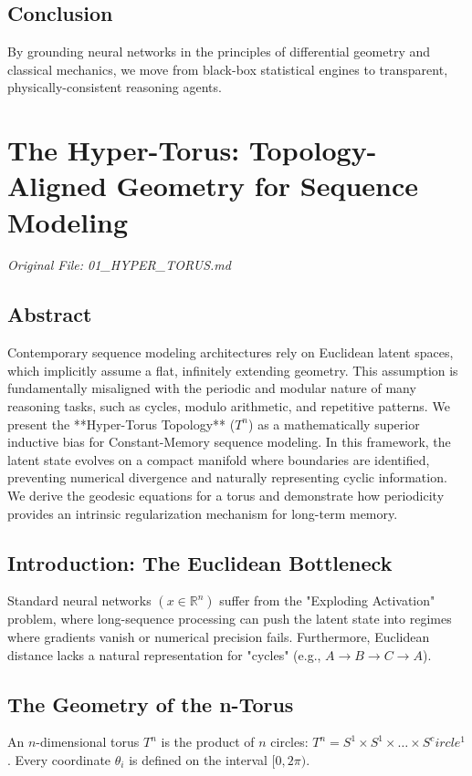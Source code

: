 \documentclass[11pt,a4paper]{report}
\begin{document}
\section{Conclusion}
By grounding neural networks in the principles of differential geometry and classical mechanics, we move from black-box statistical engines to transparent, physically-consistent reasoning agents.

\chapter{The Hyper-Torus: Topology-Aligned Geometry for Sequence Modeling}
\textit{Original File: 01\_HYPER\_TORUS.md}

\section{Abstract}
Contemporary sequence modeling architectures rely on Euclidean latent spaces, which implicitly assume a flat, infinitely extending geometry. This assumption is fundamentally misaligned with the periodic and modular nature of many reasoning tasks, such as cycles, modulo arithmetic, and repetitive patterns. We present the **Hyper-Torus Topology** ($T^n$) as a mathematically superior inductive bias for Constant-Memory sequence modeling. In this framework, the latent state evolves on a compact manifold where boundaries are identified, preventing numerical divergence and naturally representing cyclic information. We derive the geodesic equations for a torus and demonstrate how periodicity provides an intrinsic regularization mechanism for long-term memory.

\section{Introduction: The Euclidean Bottleneck}
Standard neural networks $(x \in \mathbb{R}^n)$ suffer from the "Exploding Activation" problem, where long-sequence processing can push the latent state into regimes where gradients vanish or numerical precision fails. Furthermore, Euclidean distance lacks a natural representation for "cycles" (e.g., $A \to B \to C \to A$).

\section{The Geometry of the n-Torus}
An $n$-dimensional torus $T^n$ is the product of $n$ circles: $T^n = S^1 \times S^1 \times \dots \times S^ circle^1$. Every coordinate $\theta_i$ is defined on the interval $[0, 2\pi)$.
\end{document}
